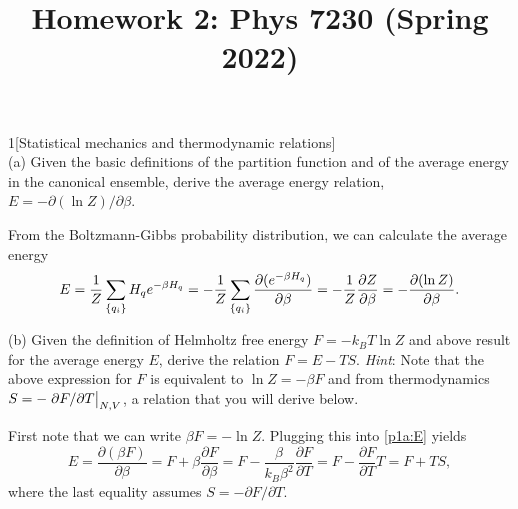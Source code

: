 \documentclass[12pt]{article}
\title{Homework 2: Phys 7230 (Spring 2022)}
\begin{document}
\maketitle
\begin{problem}{1}[Statistical mechanics and thermodynamic relations]~\\

(a) Given the basic definitions of the partition function and of the average
energy in the canonical ensemble, derive the average energy relation,
$E=-\partial(\ln Z)/\partial\beta$.
\begin{solution}
    From the Boltzmann-Gibbs probability distribution, we can calculate the
average energy
\begin{align}\label{p1a:E}
    E
    =\frac1Z\sum_\qty{q_i}H_qe^{-\beta H_q}
    =-\frac1Z\sum_\qty{q_i}\frac{\partial(e^{-\beta H_q})}{\partial\beta}
    =-\frac1Z\frac{\partial Z}{\partial\beta}
    =-\frac{\partial(\ln Z)}{\partial\beta}.
\end{align}
\end{solution}

(b) Given the definition of Helmholtz free energy $F=-k_BT\ln Z$ and above
result for the average energy $E$, derive the relation $F=E-TS$. \textit{Hint}:
Note that the above expression for $F$ is equivalent to $\ln Z=-\beta F$ and
from thermodynamics $S=-\eval{\partial F/\partial T}_{N,V}$, a relation that you
will derive below.
\begin{solution}
    First note that we can write $\beta F=-\ln Z$. Plugging this into
\eqref{p1a:E} yields
\begin{equation}\label{p1b:E}
    E=\frac{\partial(\beta F)}{\partial\beta}
    =F+\beta\frac{\partial F}{\partial\beta}
    =F-\frac{\beta}{k_B\beta^2}\frac{\partial F}{\partial T}
    =F-\frac{\partial F}{\partial T}T
    =F+TS,
\end{equation}
where the last equality assumes $S=-\partial F/\partial T$.
\end{solution}


\end{problem}
\end{document}
